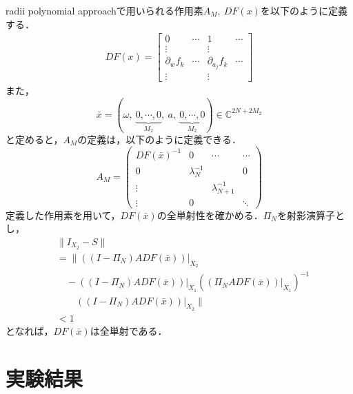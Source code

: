 \documentclass[a4paper,10pt,twocolumn]{jsarticle}
\newcommand{\rad}{radii polynomial approach}
\begin{document}
\rad{}で用いられる作用素$A_M,\ DF(x)$を以下のように定義する．
\begin{equation}
  \begin{split}
    DF(x) = \left[
      \begin{array}{c|ccc}
        0 & \cdots & 1 & \cdots \\ \hline
        \vdots & & \vdots &  \\
        \partial_w f_k & \cdots & \partial_{a_j}f_k & \cdots \\
        \vdots & & \vdots &
      \end{array}
    \right] %
  \end{split}
\end{equation}
また，
\begin{equation}
  \bar{x} = (\omega,\ \underbrace{0,\cdots,0}_{M_2},\ a,\ \underbrace{0,\cdots,0}_{M_2}) \in \mathbb{C}^{2N+2M_2}
\end{equation}
と定めると，$A_M$の定義は，以下のように定義できる．
\begin{equation}
  A_M = \left(
  \begin{array}{c|ccc}
    DF(\bar{x})^{-1} & 0 & \cdots & \cdots \\ \hline
    0 & \lambda_N^{-1} &  & 0 \\
    \vdots &  & \lambda_{N+1}^{-1} &  \\
    \vdots & 0 &   & \ddots
  \end{array}
  \right)
\end{equation}
定義した作用素を用いて，$DF(\bar{x})$の全単射性を確かめる．$\Pi_N$を射影演算子とし，
\begin{equation}
  \begin{split}
    &\| I_{X_2} - S\|\\
    &= \| \left( \left( I-\Pi_N \right) ADF ( \bar{x} ) \right)|_{X_2}  \\
    &\quad -(\left( I-\Pi_N \right) ADF( \bar{x} ))|_{X_1} \left((\Pi_N ADF(\bar{x}))|_{X_1}\right)^{-1}\\
    &\qquad ((I-\Pi_N)ADF(\bar{x}))|_{X_2} \| \\
    & < 1
  \end{split}
\end{equation}
となれば，$DF(\bar{x})$は全単射である．

\vspace{-1mm}
\section{実験結果}
\vspace{-1mm}
\end{document}
